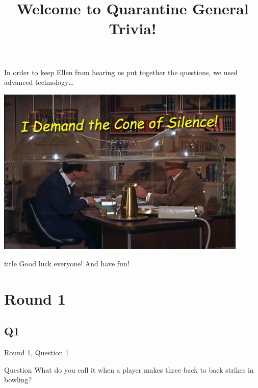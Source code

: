 \documentclass[11pt]{beamer}
\begin{document}
\title{Welcome to Quarantine General Trivia!\vspace{-0.5in}}
\date{}

\begin{frame}
\titlepage{}
\end{frame}

\begin{frame}
In order to keep Ellen from hearing us put together the questions, we used advanced
technology\ldots
\vspace{1em}
\pause{}
\begin{center}
\includegraphics[max width=0.9\textwidth,max height=0.8\textheight]{Images/cone.jpg}
\end{center}
\end{frame}

\begingroup{}
\begin{frame}
\vfill{}
\begin{beamercolorbox}[sep=8pt,center,shadow=true,rounded=true]{title}
Good luck everyone! And have fun!
\end{beamercolorbox}
\vfill{}
\end{frame}
\endgroup{}
    

\def\thisSectionName{Sports}
\section{Round 1}
    

\subsection*{Q1}
\begin{frame}[t]{Round 1, Question 1}
\vspace{0.5em}
\begin{block}{Question}
What do you call it when a player makes three back to back strikes in bowling?
\end{block}
\end{frame}
    
\end{document}
